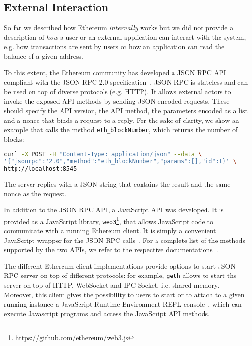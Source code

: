 \subsection{External Interaction}

So far we described how Ethereum \emph{internally} works but we did not provide
a description of \emph{how} a user or an external application can interact with
the system, e.g. how transactions are sent by users or how an application can
read the balance of a given address.

To this extent, the Ethereum community has developed a JSON RPC
API~\cite{bib:json-rpc} compliant with the JSON RPC 2.0
specification~\cite{bib:json2012json}. JSON RPC is stateless and can be used on
top of diverse protocols (e.g. HTTP). It allows external actors to invoke the
exposed API methods by sending JSON encoded requests. These should specify the
API version, the API method, the parameters encoded as a list and a nonce that
binds a request to a reply. For the sake of clarity, we show an example that
calls the method \verb|eth_blockNumber|, which returns the number of blocks:

\begin{lstlisting}[language=bash]
curl -X POST -H "Content-Type: application/json" --data \
'{"jsonrpc":"2.0","method":"eth_blockNumber","params":[],"id":1}' \
http://localhost:8545
\end{lstlisting}

The server replies with a JSON string that contains the result and the same
nonce as the request.

In addition to the JSON RPC API, a JavaScript API was developed. It is provided
as a JavaScript library,
\texttt{web3}\footnote{\url{https://github.com/ethereum/web3.js}}, that allows
JavaScript code to communicate with a running Ethereum client. It is simply a
convenient JavaScript wrapper for the JSON RPC calls~\cite{bib:javascript-api}.
For a complete list of the methods supported by the two APIs, we refer to the
respective documentations~\cite{bib:json-rpc, bib:javascript-api}.

The different Ethereum client implementations provide options to start JSON RPC
server on top of different protocols: for example, \texttt{geth} allows to start
the server on top of HTTP, WebSocket and IPC Socket, i.e. shared memory.
Moreover, this client gives the possibility to users to start or to attach to a
given running instance a JavaScript Runtime Environment REPL
console~\cite{bib:js-console}, which can execute Javascript programs and access
the JavaScript API methods.
